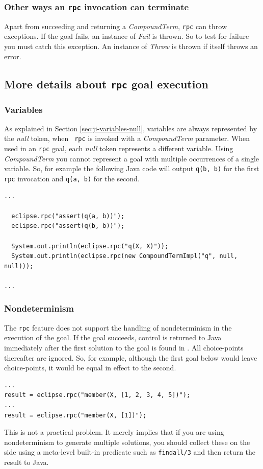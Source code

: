 \subsubsection*{Other ways an {\tt rpc} invocation can terminate}
Apart from succeeding and returning a {\it CompoundTerm}, {\tt rpc} can throw
exceptions. If the goal fails, an instance of {\it Fail} is
thrown. So to test for failure you must catch this exception.  An
instance of {\it Throw} is thrown if {\eclipse} itself throws an
error.


\subsection{More details about {\tt rpc} goal execution}
\label{sec:ji-goal-execution}
\subsubsection*{Variables}
As explained in Section \ref{sec:ji-variables-null}, {\eclipse}
variables are always represented by the {\it null} token, when {\tt
rpc} is invoked with a {\it CompoundTerm} parameter. When used in an
{\tt rpc} goal, each {\it null} token represents a different
variable. Using {\it CompoundTerm} you cannot represent a goal with
multiple occurrences of a single variable. So, for example the
following Java code will output {\tt q(b, b)} for the first {\tt rpc}
invocation and {\tt q(a, b)} for the second.

\begin{verbatim}
...

  eclipse.rpc("assert(q(a, b))");
  eclipse.rpc("assert(q(b, b))");

  System.out.println(eclipse.rpc("q(X, X)"));
  System.out.println(eclipse.rpc(new CompoundTermImpl("q", null, null)));

...
\end{verbatim}

\subsubsection*{Nondeterminism}

The {\tt rpc} feature does not support the handling of nondeterminism
in the execution of the {\eclipse} goal. If the goal succeeds, control
is returned to Java immediately after the first solution to the goal
is found in {\eclipse}. All choice-points thereafter are ignored. So,
for example, although the first {\eclipse} goal below would leave
choice-points, it would be equal in effect to the second.
\begin{verbatim}
...
result = eclipse.rpc("member(X, [1, 2, 3, 4, 5])");
...
result = eclipse.rpc("member(X, [1])");
\end{verbatim}
This is not a practical problem. It merely implies that if you are
using nondeterminism to generate multiple solutions, you should
collect these on the {\eclipse} side using a meta-level built-in
predicate such as {\tt findall/3} and then return the result to Java.

